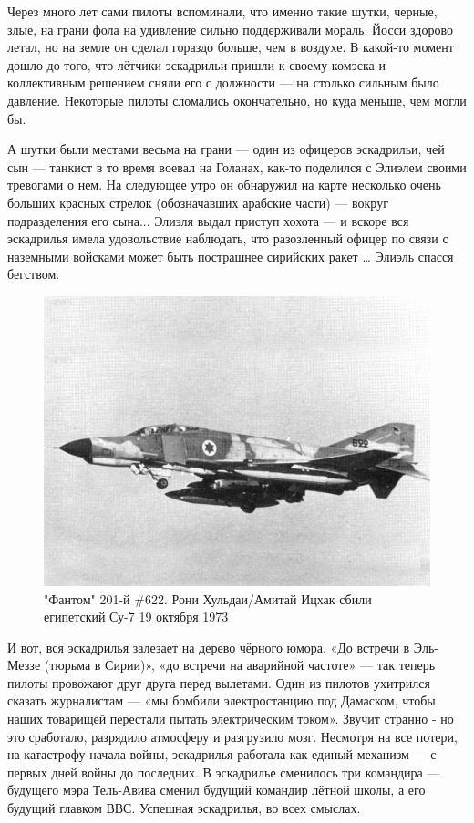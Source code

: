 Через много лет сами пилоты вспоминали, что именно такие шутки, черные, злые, на грани фола на удивление сильно поддерживали мораль. Йосси здорово летал, но на земле он сделал гораздо больше, чем в воздухе. В какой-то момент дошло до того, что лётчики эскадрильи пришли к своему комэска и коллективным решением сняли его с должности — на столько сильным было давление. Некоторые пилоты сломались окончательно, но куда меньше, чем могли бы.

А шутки были местами весьма на грани — один из офицеров эскадрильи, чей сын — танкист в то время воевал на Голанах, как-то поделился с Элиэлем своими тревогами о нем. На следующее утро он обнаружил на карте несколько очень больших красных стрелок (обозначавших арабские части) — вокруг подразделения его сына... Элиэля выдал приступ хохота — и вскоре вся эскадрилья имела удовольствие наблюдать, что разозленный офицер по связи с наземными войсками может быть пострашнее сирийских ракет … Элиэль спасся бегством.

\begin{figure}[h!tb] 
	\centering\includegraphics[scale=0.6]{History_Yosya/_bVHHJl_XSk.jpg}
	\caption{"Фантом" 201-й \#622. Рони Хульдаи/Амитай Ицхак сбили египетский Су-7 19 октября 1973}%
\end{figure}

И вот, вся эскадрилья залезает на дерево чёрного юмора. «До встречи в Эль-Меззе (тюрьма в Сирии)», «до встречи на аварийной частоте» — так теперь пилоты провожают друг друга перед вылетами. Один из пилотов ухитрился сказать журналистам — «мы бомбили электростанцию под Дамаском, чтобы наших товарищей перестали пытать электрическим током». Звучит странно - но это сработало, разрядило атмосферу и разгрузило мозг. Несмотря на все потери, на катастрофу начала войны, эскадрилья работала как единый механизм — с первых дней войны до последних. В эскадрилье сменилось три командира — будущего мэра Тель-Авива сменил будущий командир лётной школы, а его будущий главком ВВС. Успешная эскадрилья, во всех смыслах.

